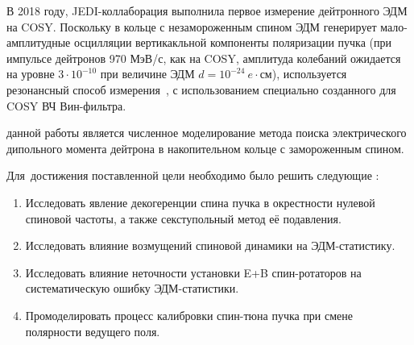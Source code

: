 В 2018 году, JEDI-коллаборация выполнила первое измерение дейтронного ЭДМ на COSY. Поскольку в кольце с
незамороженным спином ЭДМ генерирует мало-амплитудные осцилляции вертикакльной компоненты поляризации пучка
(при импульсе дейтронов 970 МэВ/с, как на COSY, амплитуда колебаний ожидается на уровне $3\cdot10^{-10}$
при величине ЭДМ $d = 10^{-24}~e\cdot$см), используется резонансный
способ измерения~\cite{COSY:Partially-Frozen-Spin}, с использованием специально созданного для COSY
ВЧ Вин-фильтра.~\cite{JSlim:RFWF:Design, JSlim:RFWF:Commisioning}



{\aim} данной работы является численное моделирование метода поиска электрического дипольного момента дейтрона в накопительном кольце с замороженным спином.

Для~достижения поставленной цели необходимо было решить следующие {\tasks}:
\begin{enumerate}
  \item Исследовать явление декогеренции спина пучка в окрестности нулевой спиновой частоты, а также секступольный метод её подавления. 
  \item Исследовать влияние возмущений спиновой динамики на ЭДМ-статистику.
  \item Исследовать влияние неточности установки E+B спин-ротаторов на систематическую ошибку ЭДМ-статистики.
  \item Промоделировать процесс калибровки спин-тюна пучка при смене полярности ведущего поля.
\end{enumerate}


